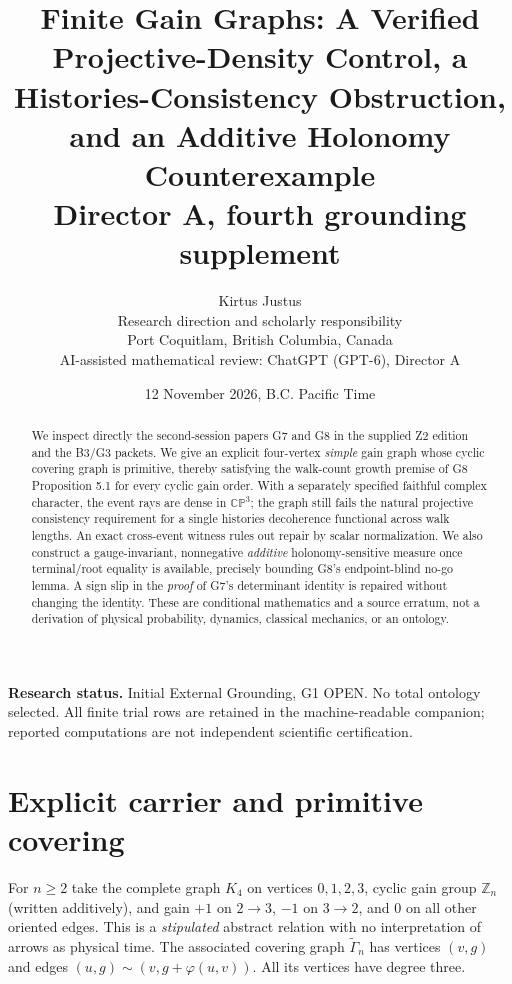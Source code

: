 \documentclass[11pt]{article}
\title{\bfseries\color{navy} Finite Gain Graphs: A Verified Projective-Density Control, a Histories-Consistency Obstruction, and an Additive Holonomy Counterexample\\[4pt]
\large Director A, fourth grounding supplement}
\author{Kirtus Justus\\\small Research direction and scholarly responsibility\\\small Port Coquitlam, British Columbia, Canada\\[4pt]
\small AI-assisted mathematical review: ChatGPT (GPT-6), Director A}
\date{12 November 2026, B.C. Pacific Time}
\newcommand{\cp}{\mathbb{CP}}
\newcommand{\Z}{\mathbb Z}
\begin{document}
\maketitle
\begin{abstract}
We inspect directly the second-session papers G7 and G8 in the supplied Z2 edition and the B3/G3 packets. We give an explicit four-vertex \emph{simple} gain graph whose cyclic covering graph is primitive, thereby satisfying the walk-count growth premise of G8 Proposition 5.1 for every cyclic gain order. With a separately specified faithful complex character, the event rays are dense in $\cp^3$; the graph still fails the natural projective consistency requirement for a single histories decoherence functional across walk lengths. An exact cross-event witness rules out repair by scalar normalization. We also construct a gauge-invariant, nonnegative \emph{additive} holonomy-sensitive measure once terminal/root equality is available, precisely bounding G8's endpoint-blind no-go lemma. A sign slip in the \emph{proof} of G7's determinant identity is repaired without changing the identity. These are conditional mathematics and a source erratum, not a derivation of physical probability, dynamics, classical mechanics, or an ontology.
\end{abstract}
\noindent\textbf{Research status.} Initial External Grounding, G1 OPEN. No total ontology selected. All finite trial rows are retained in the machine-readable companion; reported computations are not independent scientific certification.

\section{Explicit carrier and primitive covering}
For $n\ge 2$ take the complete graph $K_4$ on vertices $0,1,2,3$, cyclic gain group $\Z_n$ (written additively), and gain $+1$ on $2\to3$, $-1$ on $3\to2$, and $0$ on all other oriented edges. This is a \emph{stipulated} abstract relation with no interpretation of arrows as physical time. The associated covering graph $\widetilde\Gamma_n$ has vertices $(v,g)$ and edges $(u,g)\sim(v,g+\varphi(u,v))$. All its vertices have degree three.

\begin{center}
\end{center}
\end{document}
